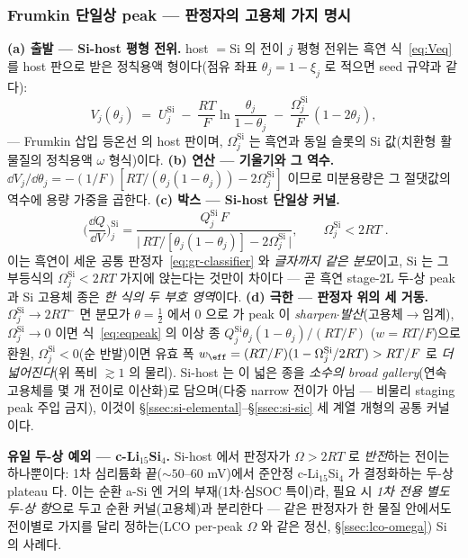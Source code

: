 \subsubsection{Frumkin 단일상 peak --- 판정자의 고용체 가지 명시}\label{ssec:si-frumkin-peak}
\textbf{(a) 출발 --- Si-host 평형 전위.} host $=$Si 의 전이 $j$ 평형 전위는 흑연 식~\eqref{eq:Veq} 를 host 판으로
받은 정칙용액 형이다(점유 좌표 $\theta_j=1-\xi_j$ 로 적으면 seed 규약과 같다):
\begin{equation}
V_j(\theta_j)\;=\;U_j^\mathrm{Si}\;-\;\frac{RT}{F}\ln\frac{\theta_j}{1-\theta_j}\;-\;\frac{\Omega_j^\mathrm{Si}}{F}\,(1-2\theta_j),
\label{eq:si-fr-V}
\end{equation}
--- Frumkin 삽입 등온선\cite{leviaurbach1999} 의 host 판이며, $\Omega_j^\mathrm{Si}$ 는 흑연과 동일 슬롯의 Si
값(치환형 활물질의 정칙용액 $\omega$ 형식\cite{verbrugge2017})이다. \textbf{(b) 연산 --- 기울기와 그 역수.}
$\dd V_j/\dd\theta_j=-(1/F)[RT/(\theta_j(1-\theta_j))-2\Omega_j^\mathrm{Si}]$ 이므로 미분용량은 그 절댓값의
역수에 용량 가중을 곱한다. \textbf{(c) 박스 --- Si-host 단일상 커널.}
\begin{equation}
\boxed{\;
\Big(\frac{\dd Q}{\dd V}\Big)^\mathrm{Si}_j
=\frac{Q_j^\mathrm{Si}\,F}{\big|\,RT/[\theta_j(1-\theta_j)]-2\Omega_j^\mathrm{Si}\,\big|},
\qquad \Omega_j^\mathrm{Si}<2RT\;.}
\label{eq:si-fr-peak}
\end{equation}
이는 흑연이 세운 공통 판정자~\eqref{eq:gr-classifier} 와 \emph{글자까지 같은 분모}이고, Si 는 그 부등식의
$\Omega_j^\mathrm{Si}<2RT$ 가지에 앉는다는 것만이 차이다 --- 곧 흑연 stage-2L 두-상 peak 과 Si 고용체 종은
\emph{한 식의 두 부호 영역}이다. \textbf{(d) 극한 --- 판정자 위의 세 거동.} $\Omega_j^\mathrm{Si}\!\to\!2RT^-$
면 분모가 $\theta{=}\tfrac12$ 에서 $0$ 으로 가 peak 이 \emph{sharpen$\cdot$발산}(고용체$\to$임계),
$\Omega_j^\mathrm{Si}\!\to\!0$ 이면 식~\eqref{eq:eqpeak} 의 이상 종 $Q_j^\mathrm{Si}\theta_j(1-\theta_j)/(RT/F)$
($w{=}RT/F$)으로 환원, $\Omega_j^\mathrm{Si}<0$(순 반발)이면 유효 폭 $w_\eff=(RT/F)(1-\Omega_j^\mathrm{Si}/2RT)>RT/F$
로 \emph{더 넓어진다}(위 폭비 $\gtrsim1$ 의 물리). Si-host 는 이 넓은 종을 \emph{소수의 broad gallery}(연속
고용체를 몇 개 전이로 이산화)로 담으며(다중 narrow 전이가 아님 --- 비물리 staging peak 주입 금지), 이것이
\S\ref{ssec:si-elemental}--\S\ref{ssec:si-sic} 세 계열 개형의 공통 커널이다.

\textbf{유일 두-상 예외 --- c-Li$_{15}$Si$_4$.} Si-host 에서 판정자가 $\Omega>2RT$ 로 \emph{반전}하는 전이는
하나뿐이다: 1차 심리튬화 끝($\sim\!50$--$60$ mV)에서 준안정 c-Li$_{15}$Si$_4$ 가 결정화하는 두-상
plateau\cite{obrovac_christensen2004} 다. 이는 순환 a-Si 엔 거의 부재(1차$\cdot$심SOC 특이)라, 필요 시
\emph{1차 전용 별도 두-상 항}으로 두고 순환 커널(고용체)과 분리한다 --- 같은 판정자가 한 물질 안에서도
전이별로 가지를 달리 정하는(LCO per-peak $\Omega$ 와 같은 정신, \S\ref{ssec:lco-omega}) Si 의 사례다.

